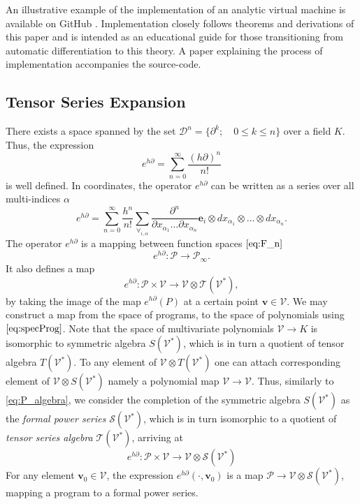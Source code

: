 \documentclass[11pt]{article}
\newcommand{\Ss}{\mathcal{S}}
\newcommand{\T}{\mathcal{T}}
\newcommand{\VV}{\mathcal{V}}
\newcommand{\e}{\mathbf{e}}
\newcommand{\vv}{\mathbf{v}}
\newcommand{\dP}{\mathcal{P}}
\newcommand{\D}{\partial}
\newcommand{\DD}{\mathcal{D}}
\begin{document}
An illustrative example of the implementation of an analytic virtual machine is available on
GitHub \citep{dC++}. Implementation closely follows theorems and derivations of
this paper and is intended as an educational guide for those transitioning from
automatic differentiation to this theory. A paper \citep{dC++Paper} explaining
the process of implementation accompanies the source-code.  

 \subsection{Tensor Series Expansion}\label{sec:Vrsta}
 
 
There exists a space spanned by the set $\DD^n=\{\D^k;\quad 0\le k\le n\}$ over a field $K$. Thus, the expression
 \begin{equation*}
 	e^{h\D}=\sum\limits_{n=0}^{\infty}\frac{(h\D)^n}{n!}
 \end{equation*}
 is well defined. In coordinates, the operator $e^{h\D}$ can be written as a
 series over all multi-indices $\alpha$
 \begin{equation}\label{eq:e^d}
 	e^{h\D}=\sum\limits_{n=0}^{\infty}\frac{h^n}{n!}\sum_{\forall_{i,\alpha}}\frac{\partial^n}{\partial
 		    x_{\alpha_1}\ldots \partial x_{\alpha_n}}\e_i\otimes
 		  dx_{\alpha_1}\otimes\ldots \otimes dx_{\alpha_n}.
 \end{equation}
The operator $e^{h\D}$ is a mapping between function spaces $\eqref{eq:F_n}$
 \begin{equation*}
 	e^{h\D}:\dP\to\dP_\infty.
 \end{equation*}
 It also defines a map
  \begin{equation}\label{eq:specProg}
  	e^{h\D}:\dP\times \VV\to \VV\otimes \T(\VV^*),
  \end{equation}
by taking the image of the map $e^{h\D}(P)$ at a certain point $\vv\in \VV$.  
We may construct a map from the space of programs,
to the space of polynomials using  $\eqref{eq:specProg}$. Note that the space of
multivariate polynomials 
$\VV\to K$ is isomorphic to symmetric algebra $S(\VV^*)$, which is in turn a
quotient of tensor algebra $T(\VV^*)$.
To any element of
 $\VV\otimes T(\VV^*)$ one can attach corresponding element of $\VV\otimes S(\VV^*)$
 namely a polynomial map  $\VV\to \VV$. Thus, similarly to \eqref{eq:P_algebra}, we consider the completion of the symmetric algebra $S(\VV^*)$ as the \emph{formal power series} $\Ss(\VV^{*})$, which is in turn isomorphic to a quotient of \emph{tensor series algebra} $\T(\VV^*)$, arriving at 
 \begin{equation}\label{eq:pToPol}
 	e^{h\D}: \dP\times \VV\to \VV\otimes \Ss(\VV^*)
 \end{equation}
 For any element $\vv_0\in \VV$, the expression $e^{h\D}(\cdot,\vv_0)$ is a map $\dP\to
 \VV\otimes \Ss(\VV^*)$, mapping a program to a formal power series.
\end{document}

